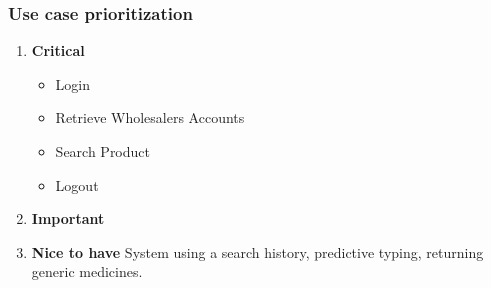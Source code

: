 \documentclass[a4paper,10pt]{article}
\begin{document}
	\subsubsection{Use case prioritization} 
		\begin{enumerate} 
		\item \textbf{Critical} 
			\begin{itemize} 
				\item Login
				\item Retrieve Wholesalers Accounts 
				\item Search Product 
				\item Logout
			\end{itemize} 
		\item \textbf{Important} 

		\item \textbf{Nice to have}
		System using a search history, predictive typing, returning generic medicines. \\\\
		\end{enumerate} 
\end{document}
